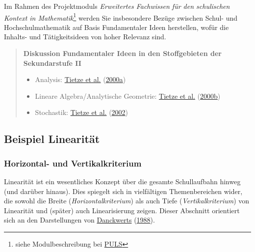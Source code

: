 \documentclass[
  ngerman,
]{scrbook}
\providecommand{\tightlist}{%
  \setlength{\itemsep}{0pt}\setlength{\parskip}{0pt}}
\theoremstyle{definition}
\theoremstyle{definition}
\theoremstyle{definition}
\theoremstyle{definition}
\theoremstyle{remark}
\begin{document}
Im Rahmen des Projektmoduls \emph{Erweitertes Fachwissen für den schulischen Kontext in Mathematik}\footnote{siehe Modulbeschreibung bei \href{https://puls.uni-potsdam.de/qisserver/rds?state=verpublish\&status=init\&vmfile=no\&moduleCall=modulansicht\&publishConfFile=modulverwaltung\&publishSubDir=up/modulbearbeiter\&\&modul.modul_id=3156\&menuid=\&topitem=Modulbeschreibung\&subitem=}{PULS}} werden Sie insbesondere Bezüge zwischen Schul- und Hochschulmathematik auf Basis Fundamentaler Ideen herstellen, wofür die Inhalts- und Tätigkeitsideen von hoher Relevanz sind.

\begin{quote}
\textbf{Diskussion Fundamentaler Ideen in den Stoffgebieten der Sekundarstufe II}

\begin{itemize}
\tightlist
\item
  Analysis: \protect\hyperlink{ref-Tietze:2000a}{Tietze et al.} (\protect\hyperlink{ref-Tietze:2000a}{2000a})
\item
  Lineare Algebra/Analytische Geometrie: \protect\hyperlink{ref-Tietze:2000}{Tietze et al.} (\protect\hyperlink{ref-Tietze:2000}{2000b})
\item
  Stochastik: \protect\hyperlink{ref-Tietze:2002}{Tietze et al.} (\protect\hyperlink{ref-Tietze:2002}{2002})
\end{itemize}
\end{quote}

\hypertarget{beispiel-linearitaet}{%
\subsection{Beispiel Linearität}\label{beispiel-linearitaet}}

\hypertarget{horizontal--und-vertikalkriterium}{%
\subsubsection{Horizontal- und Vertikalkriterium}\label{horizontal--und-vertikalkriterium}}

Linearität ist ein wesentliches Konzept über die gesamte Schullaufbahn hinweg (und darüber hinaus). Dies spiegelt sich in vielfältigen Themenbereichen wider, die sowohl die Breite (\emph{Horizontalkriterium}) als auch Tiefe (\emph{Vertikalkriterium}) von Linearität und (später) auch Linearisierung zeigen. Dieser Abschnitt orientiert sich an den Darstellungen von \protect\hyperlink{ref-Danckwerts:1988}{Danckwerts} (\protect\hyperlink{ref-Danckwerts:1988}{1988}).
\end{document}
